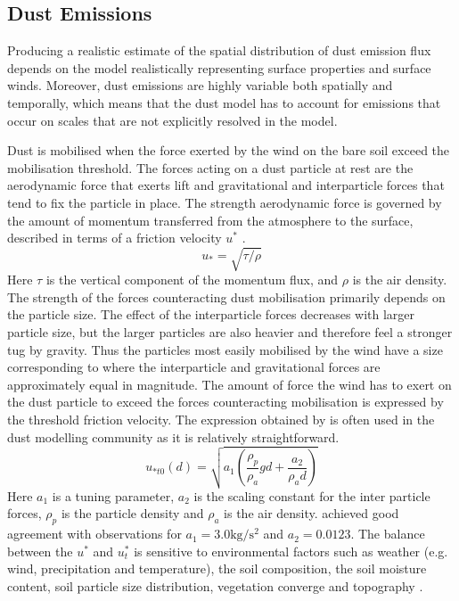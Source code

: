 \subsection{Dust Emissions}\label{sec:dust_emission_modelling}
Producing a realistic estimate of the spatial distribution of dust emission flux depends on the model realistically representing surface properties and surface winds. Moreover, dust emissions are highly variable both spatially and temporally, which means that the dust model has to account for emissions that occur on scales that are not explicitly resolved in the model.        

Dust is mobilised when the force exerted by the wind on the bare soil exceed the mobilisation threshold. The forces acting on a dust particle at rest are the aerodynamic force that exerts lift and gravitational and interparticle forces that tend to fix the particle in place. 
The strength aerodynamic force is governed by the amount of momentum transferred from the atmosphere to the surface, described in terms of a friction velocity $u^*$ \parencite{ShaoYaping2008PaMo}.
\begin{equation}
    u_* = \sqrt{\tau/\rho}
\end{equation}
Here $\tau$ is the vertical component of the momentum flux, and $\rho$ is the air density. The strength of the forces counteracting dust mobilisation primarily depends on the particle size. The effect of the interparticle forces decreases with larger particle size, but the larger particles are also heavier and therefore feel a stronger tug by gravity. Thus the particles most easily mobilised by the wind have a size corresponding to where the interparticle and gravitational forces are approximately equal in magnitude.     
The amount of force the wind has to exert on the dust particle to exceed the forces counteracting mobilisation is expressed by the threshold friction velocity. The expression obtained by \textcite{shao2000simple} is often used in the dust modelling community as it is relatively straightforward. 
\begin{equation}\label{eq:treshold_fric_vel}
    u_{*t0}(d) = \sqrt{a_1 \left(\frac{\rho_p}{\rho_a}gd+\frac{a_2}{\rho_ad}\right)} 
\end{equation}
Here $a_1$ is a tuning parameter, $a_2$ is the scaling constant for the inter particle forces, $\rho_p$ is the particle density and $\rho_a$ is the air density. \textcite{shao2000simple} achieved good agreement with observations for $a_1 = 3.0\si{\kg\per\s\squared}$ and $a_2 = 0.0123$. 
The balance between the $u^*$ and $u^*_t$ is sensitive to environmental factors such as weather (e.g. wind, precipitation and temperature), the soil composition, the soil moisture content, soil particle size distribution, vegetation converge and topography .  
